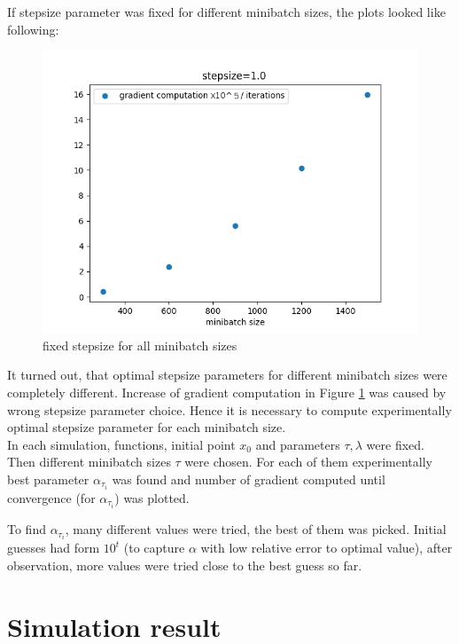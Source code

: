 \documentclass[11pt]{book}
\begin{document}
If stepsize parameter was fixed for different minibatch sizes, the plots looked like following:

\begin{figure}[H]
	\centering
	\includegraphics[width=.7\linewidth]{fixed_stepsize.png}
	\caption{fixed stepsize for all minibatch sizes}
	\label{fig:fixed stepsize}
\end{figure}

It turned out, that optimal stepsize parameters for different minibatch sizes were completely different. Increase of gradient computation in Figure \ref{fig:fixed stepsize} was caused by wrong stepsize parameter choice. Hence it is necessary to compute experimentally optimal stepsize parameter for each minibatch size.\\


In each simulation, functions, initial point $x_0$ and parameters $\tau, \lambda$ were fixed. Then different minibatch sizes $\tau$ were chosen. For each of them experimentally best parameter $\alpha_{\tau_i}$ was found and number of gradient computed until convergence (for $\alpha_{\tau_i}$) was plotted. 

To find $\alpha_{\tau_i}$, many different values were tried, the best of them was picked. Initial guesses had form $10^t$ (to capture $\alpha$ with low relative error to optimal value), after observation, more values were tried close to the best guess so far.\\

\section{Simulation result}
\end{document}
